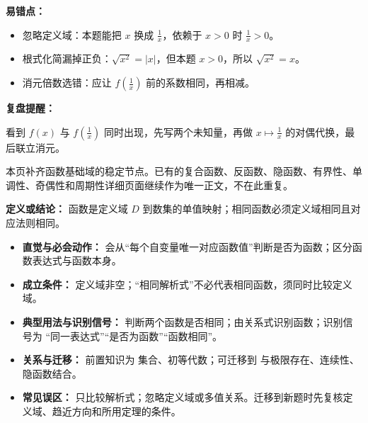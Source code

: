 \begin{mistakeBox}
\textbf{易错点：}

\begin{itemize}
  \item 忽略定义域：本题能把 \(x\) 换成 \(\frac{1}{x}\)，依赖于 \(x>0\) 时 \(\frac{1}{x}>0\)。
  \item 根式化简漏掉正负：\(\sqrt{x^2}=|x|\)，但本题 \(x>0\)，所以 \(\sqrt{x^2}=x\)。
  \item 消元倍数选错：应让 \(f\left(\frac{1}{x}\right)\) 前的系数相同，再相减。
\end{itemize}

\textbf{复盘提醒：}

看到 \(f(x)\) 与 \(f\left(\frac{1}{x}\right)\) 同时出现，先写两个未知量，再做 \(x\mapsto \frac{1}{x}\) 的对偶代换，最后联立消元。
\end{mistakeBox}


\begin{knowledgeBox}
本页补齐函数基础域的稳定节点。已有的复合函数、反函数、隐函数、有界性、单调性、奇偶性和周期性详细页面继续作为唯一正文，不在此重复。
\end{knowledgeBox}

\begin{knowledgeBox}
\textbf{定义或结论：} 函数是定义域 $D$ 到数集的单值映射；相同函数必须定义域相同且对应法则相同。

\begin{itemize}
  \item \textbf{直觉与必会动作：} 会从“每个自变量唯一对应函数值”判断是否为函数；区分函数表达式与函数本身。
  \item \textbf{成立条件：} 定义域非空；“相同解析式”不必代表相同函数，须同时比较定义域。
  \item \textbf{典型用法与识别信号：} 判断两个函数是否相同；由关系式识别函数；识别信号为 “同一表达式”“是否为函数”“函数相同”。
  \item \textbf{关系与迁移：} 前置知识为 集合、初等代数；可迁移到 与极限存在、连续性、隐函数结合。
  \item \textbf{常见误区：} 只比较解析式；忽略定义域或多值关系。迁移到新题时先复核定义域、趋近方向和所用定理的条件。
\end{itemize}
\end{knowledgeBox}

